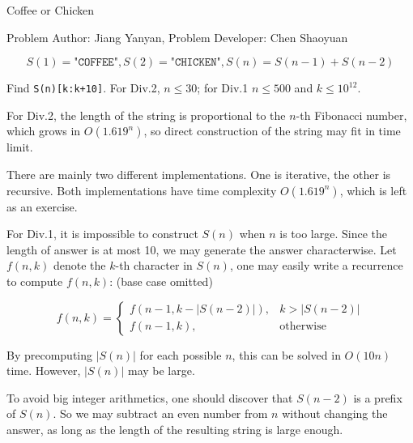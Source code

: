 \begin{Solution}{Coffee or Chicken}

\begin{frame}{\ProblemName}

\small Problem Author: Jiang Yanyan, Problem Developer: Chen Shaoyuan \par 


$$S(1) = \texttt{"COFFEE"}, S(2) = \texttt{"CHICKEN"}, S(n) = S(n-1) + S(n-2)$$

Find \texttt{S(n)[k:k+10]}. For Div.2, $n \leq 30$; for Div.1 $n \leq 500$ and $k \leq 10^{12}$.

\pause

For Div.2, the length of the string is proportional to the $n$-th Fibonacci number, which grows in $O(1.619^n)$, so direct construction of the string may fit in time limit. 

There are mainly two different implementations. One is iterative, the other is recursive. Both implementations have time complexity $O(1.619^n)$, which is left as an exercise. 

\end{frame}

\begin{frame}{\ProblemName}

For Div.1, it is impossible to construct $S(n)$ when $n$ is too large. Since the length of answer is at most 10, we may generate the answer characterwise. Let $f(n, k)$ denote the $k$-th character in $S(n)$, one may easily write a recurrence to compute $f(n, k)$: (base case omitted)

$$ f(n, k) = \begin{cases}
f(n-1, k - |S(n-2)|), & k > |S(n-2)| \\
f(n-1, k), & \text{otherwise}
\end{cases} $$

\pause

By precomputing $|S(n)|$ for each possible $n$, this can be solved in $O(10n)$ time. However, $|S(n)|$ may be large.

\pause

To avoid big integer arithmetics, one should discover that $S(n-2)$ is a prefix of $S(n)$. So we may subtract an even number from $n$ without changing the answer, as long as the length of the resulting string is large enough.

\end{frame}

\end{Solution}
